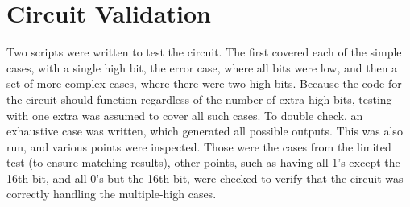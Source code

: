 \documentclass[Report1]{subfiles}
\begin{document}
\section{Circuit Validation}
Two scripts were written to test the circuit. The first covered each of the simple cases, with a single high bit, the error case, where all bits were low, and then a set of more complex cases, where there were two high bits. Because the code for the circuit should function regardless of the number of extra high bits, testing with one extra was assumed to cover all such cases. 
To double check, an exhaustive case was written, which generated all possible outputs. This was also run, and various points were inspected. Those were the cases from the limited test (to ensure matching results), other points, such as having all 1's except the 16th bit, and all 0's but the 16th bit, were checked to verify that the circuit was correctly handling the multiple-high cases. 
\end{document}

